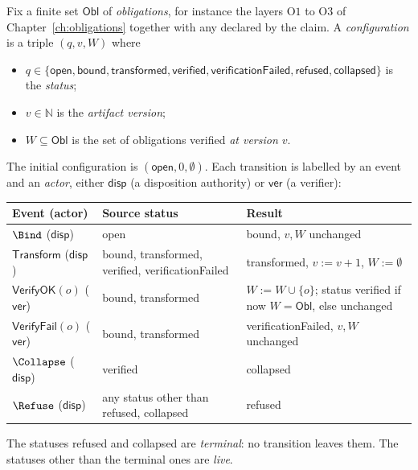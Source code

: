 \begin{definition}
\label{def:lifecycle}
Fix a finite set $\mathsf{Obl}$ of \emph{obligations}, for instance the layers $\mathrm O1$ to $\mathrm O3$ of Chapter~\ref{ch:obligations} together with any declared by the claim. A \emph{configuration} is a triple $(q,v,W)$ where
\begin{itemize}[nosep]
\item $q\in\{\textsf{open},\textsf{bound},\textsf{transformed},\textsf{verified},\textsf{verificationFailed},\textsf{refused},\textsf{collapsed}\}$ is the \emph{status};
\item $v\in\mathbb N$ is the \emph{artifact version};
\item $W\subseteq\mathsf{Obl}$ is the set of obligations verified \emph{at version $v$}.
\end{itemize}
The initial configuration is $(\textsf{open},0,\emptyset)$. Each transition is labelled by an event and an \emph{actor}, either $\mathsf{disp}$ (a disposition authority) or $\mathsf{ver}$ (a verifier):
\begin{center}
\small
\begin{tabular}{@{}p{3.2cm}p{4.3cm}p{5cm}@{}}
\toprule
Event (actor) & Source status & Result\\
\midrule
$\Bind$ ($\mathsf{disp}$) & \textsf{open} & \textsf{bound}, $v,W$ unchanged\\
$\mathsf{Transform}$ ($\mathsf{disp}$) & \textsf{bound}, \textsf{transformed}, \textsf{verified}, \textsf{verificationFailed} & \textsf{transformed}, $v:=v+1$, $W:=\emptyset$\\
$\mathsf{VerifyOK}(o)$ ($\mathsf{ver}$) & \textsf{bound}, \textsf{transformed} & $W:=W\cup\{o\}$; status \textsf{verified} if now $W=\mathsf{Obl}$, else unchanged\\
$\mathsf{VerifyFail}(o)$ ($\mathsf{ver}$) & \textsf{bound}, \textsf{transformed} & \textsf{verificationFailed}, $v,W$ unchanged\\
$\Collapse$ ($\mathsf{disp}$) & \textsf{verified} & \textsf{collapsed}\\
$\Refuse$ ($\mathsf{disp}$) & any status other than \textsf{refused}, \textsf{collapsed} & \textsf{refused}\\
\bottomrule
\end{tabular}
\end{center}
The statuses \textsf{refused} and \textsf{collapsed} are \emph{terminal}: no transition leaves them. The statuses other than the terminal ones are \emph{live}.
\end{definition}

